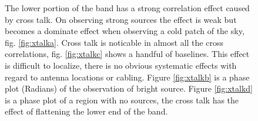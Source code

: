 \documentclass[useAMS,usenatbib,onecolumn]{mn2e}
\begin{document}
\begin{figure}
    \centering

    \caption{The lower portion of the band has a strong correlation effect caused by cross talk.
    On observing strong sources the effect is weak but becomes a dominate effect when observing a cold patch of the sky, fig. \ref{fig:xtalka}.
    Cross talk is noticable in almost all the cross correlations, fig. \ref{fig:xtalkc} shows a handful of baselines.
    This effect is difficult to localize, there is no obvious systematic effects with regard to antenna locations or cabling.
    Figure \ref{fig:xtalkb} is a phase plot (Radians) of the observation of bright source.
    Figure \ref{fig:xtalkd} is a phase plot of a region with no sources, the cross talk has the effect of flattening the lower end of the band.}
    \label{fig:xtalk}
\end{figure}
\end{document}
